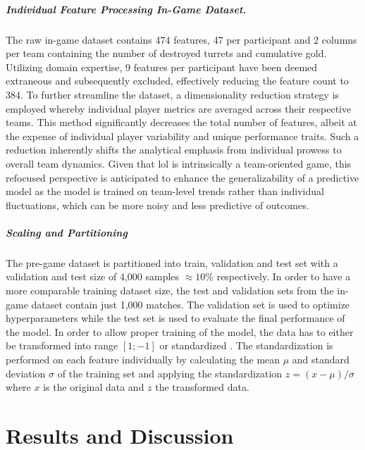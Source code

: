 \documentclass[12pt, a4paper, headinclude, twoside, plainheadsepline, open=right, numbers=noenddot, hidelinks, toc=listof, toc=bibliography]{scrreprt}
\begin{document}
\paragraph{Individual Feature Processing In-Game Dataset.}
The raw in-game dataset contains 474 features, 47 per participant and 2 columns per team containing the number of destroyed turrets and cumulative gold.
Utilizing domain expertise, 9 features per participant have been deemed extraneous and subsequently excluded, effectively reducing the feature count to 384. 
To further streamline the dataset, a dimensionality reduction strategy is employed whereby individual player metrics are averaged across their respective teams.
This method significantly decreases the total number of features, albeit at the expense of individual player variability and unique performance traits.
Such a reduction inherently shifts the analytical emphasis from individual prowess to overall team dynamics. 
Given that \ac{lol} is intrinsically a team-oriented game, this refocused perspective is anticipated to enhance the generalizability of a predictive model as the model is trained on team-level trends rather than individual fluctuations, which can be more noisy and less predictive of outcomes.




\paragraph{Scaling and Partitioning}
The pre-game dataset is partitioned into train, validation and test set with a validation and test size of 4,000 samples $ \approx 10\%$ respectively.
In order to have a more comparable training dataset size, the test and validation sets from the in-game dataset contain just 1,000 matches.
The validation set is used to optimize hyperparameters while the test set is used to evaluate the final performance of the model.
In order to allow proper training of the model, the data has to either be transformed into range $[1;-1]$ or standardized \cite{shankerEffectDataStandardization1996}.
The standardization is performed on each feature individually by calculating the mean $\mu$ and standard deviation $\sigma$ of the training set and applying the standardization $z = (x - \mu) / \sigma$ where $x$ is the original data and $z$ the transformed data.

\chapter{Results and Discussion}
\label{chap:results}
\end{document}
